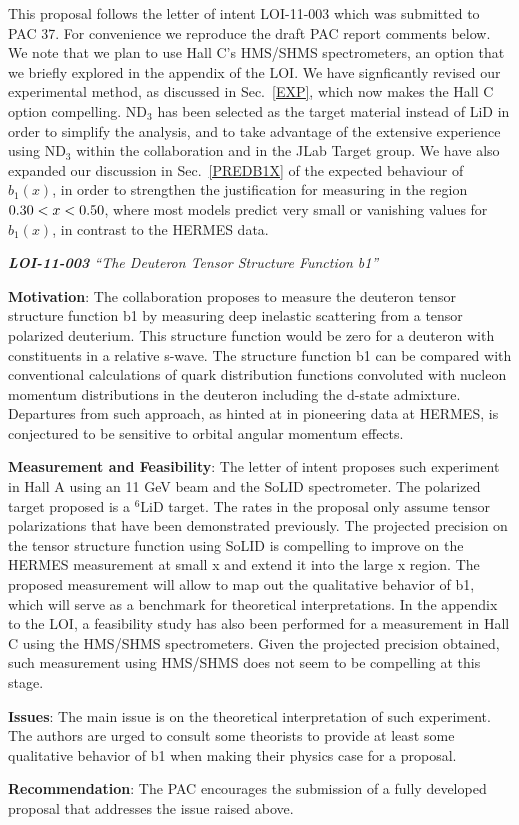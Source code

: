 This proposal follows the letter of intent LOI-11-003 which was submitted to PAC 37.  For convenience we reproduce the draft PAC report comments below.  We note that we plan to use Hall C's HMS/SHMS spectrometers, an option that we briefly explored in the appendix of the LOI. We have signficantly revised our experimental method, as discussed in Sec.~\ref{EXP},  which now makes the Hall C option compelling.   ND$_3$ has been selected as the target material instead of LiD in order to simplify the analysis, and to take advantage of the extensive experience using ND$_3$ within the collaboration and in the JLab Target group.  
We have also expanded our discussion in Sec.~\ref{PREDB1X} of the 
expected behaviour of $b_1(x)$, in order to strengthen the justification for measuring in
the region $0.30 <x<0.50$, where most models predict very small or vanishing values for $b_1(x)$, in contrast to the HERMES data.


\vspace{1cm}
{\it
\noindent
{\bf LOI-11-003} ``The Deuteron Tensor Structure Function b1''

\vspace{0.5cm}
\noindent
{\bf Motivation}: The collaboration proposes to measure the deuteron tensor structure function b1 by measuring deep inelastic scattering from a tensor polarized deuterium. This structure function would be zero for a deuteron with constituents in a relative s-wave. The structure function b1 can be compared with conventional calculations of quark distribution functions convoluted with nucleon momentum distributions in the deuteron including the d-state admixture. Departures from such approach, as hinted at in pioneering data at HERMES, is conjectured to be sensitive to orbital angular momentum effects.

\vspace{1cm}
\noindent
{\bf Measurement and Feasibility}: The letter of intent proposes such experiment in Hall A using an 11 GeV beam and the SoLID spectrometer. The polarized target proposed is a $^6$LiD target. The rates in the proposal only assume tensor polarizations that have been demonstrated previously. The projected precision on the tensor structure function using SoLID is compelling to improve on the HERMES measurement at small x and extend it into the large x region. The proposed measurement will allow to map out the qualitative behavior of b1, which will serve as a benchmark for theoretical interpretations. In the appendix to the LOI, a feasibility study has also been performed for a measurement in Hall C using the HMS/SHMS spectrometers. Given the projected precision obtained, such measurement using HMS/SHMS does not seem to be compelling at this stage.


\vspace{1cm}\noindent
{\bf Issues}: The main issue is on the theoretical interpretation of such experiment. The authors are urged to consult some theorists to provide at least some qualitative behavior of b1 when making their physics case for a proposal.


\vspace{1cm}\noindent
{\bf Recommendation}: The PAC encourages the submission of a fully developed proposal that addresses the issue raised above.
}
